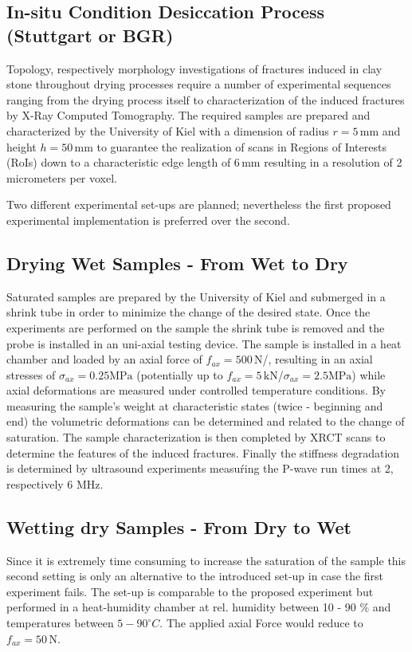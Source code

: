 \subsection{In-situ Condition Desiccation Process (Stuttgart or BGR)}
Topology, respectively morphology investigations of fractures induced in clay stone throughout drying processes require a number of experimental sequences ranging from the drying process itself to characterization of the induced fractures by X-Ray Computed Tomography. The required samples are prepared and characterized by the University of Kiel with a dimension of radius $r = 5 \, \text{mm}$ and height $h = 50 \, \text{mm}$ to guarantee the realization of scans in Regions of Interests (RoIs) down to a characteristic edge length of $6 \, \text{mm}$ resulting in a resolution of 2 micrometers per voxel.

Two different experimental set-ups are planned; nevertheless the first proposed experimental implementation is preferred over the second.

\subsection{Drying Wet Samples - From Wet to Dry}
Saturated samples are prepared by the University of Kiel and submerged in a shrink tube in order to minimize the change of the desired state. Once the experiments are performed on the sample the shrink tube is removed and the probe is installed in an uni-axial testing device. The sample is installed in a heat chamber and loaded by an axial force of $f_{ax} = 500 \, \text{N}$/, resulting in an axial stresses of $ \sigma_{ax} = 0.25 \text{MPa}$ (potentially up to $f_{ax} = 5 \, \text{kN}$/$ \sigma_{ax} = 2.5 \text{MPa}$) while axial deformations are measured under controlled temperature conditions. By measuring the sample's weight at characteristic states (twice - beginning and end) the volumetric deformations can be determined and related to the change of saturation. The sample characterization is then completed by XRCT scans to determine the features of the induced fractures. Finally the stiffness degradation is determined by ultrasound experiments measuŕing the P-wave run times at 2, respectively 6 MHz.

\subsection{Wetting dry Samples - From Dry to Wet}

Since it is extremely time consuming to increase the saturation of the sample this second setting is only an alternative to the introduced set-up in case the first experiment fails. The set-up is comparable to the proposed experiment but performed in a heat-humidity chamber at rel. humidity between 10 - 90 \% and temperatures between $5-90^\circ C$. The applied axial Force would reduce to $f_{ax} = 50 \, \text{N}$.